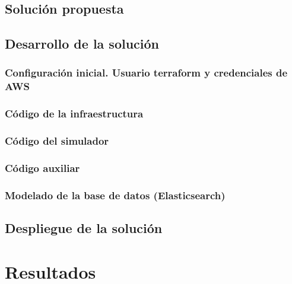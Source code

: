 \documentclass[12pt]{article}
\begin{document}
\subsection{Solución propuesta}



\subsection{Desarrollo de la solución}
\subsubsection{Configuración inicial. Usuario terraform y credenciales de AWS}


\subsubsection{Código de la infraestructura}


\subsubsection{Código del simulador}


\subsubsection{Código auxiliar}


\subsubsection{Modelado de la base de datos (Elasticsearch)}


\subsection{Despliegue de la solución}


\section{Resultados}
\end{document}
